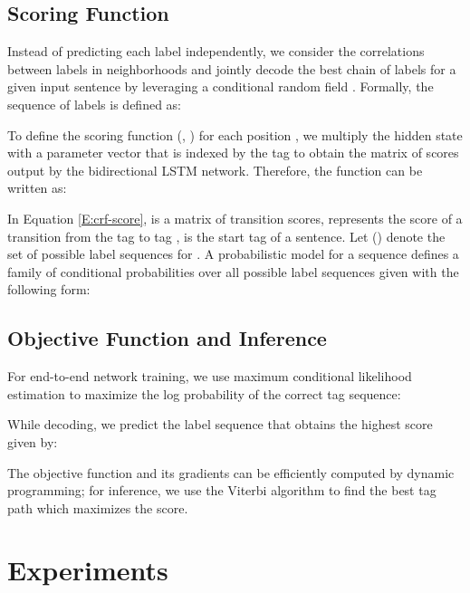 \documentclass[11pt,a4paper]{article}
\begin{document}
\subsection{Scoring Function}
Instead of predicting each label independently, we consider the correlations between labels in neighborhoods and jointly decode the best chain of labels for a given input sentence by leveraging a conditional random field \cite{lafferty2001conditional}. Formally, the sequence of labels is defined as:



To define the scoring function (, ) for each position , we multiply the hidden state  with a parameter vector  that is indexed by the tag  to obtain the matrix of scores output by the bidirectional LSTM network. Therefore, the function  can be written as:



In Equation \ref{E:crf-score},  is a matrix of transition scores,  represents the score of a transition from the tag  to tag ,  is the start tag of a sentence. Let () denote the set of possible label sequences for . A probabilistic model for a sequence defines a family of conditional probabilities  over all possible label sequences  given  with the following form:



\subsection{Objective Function and Inference}
For end-to-end network training, we use maximum conditional likelihood estimation to maximize the log probability of the correct tag sequence:



While decoding, we predict the label sequence that obtains the highest score given by:



The objective function and its gradients can be efficiently computed by dynamic programming; for inference, we use the Viterbi algorithm to find the best tag path which maximizes the score.
 
\section{Experiments}
\label{sec:experiments}
\end{document}
